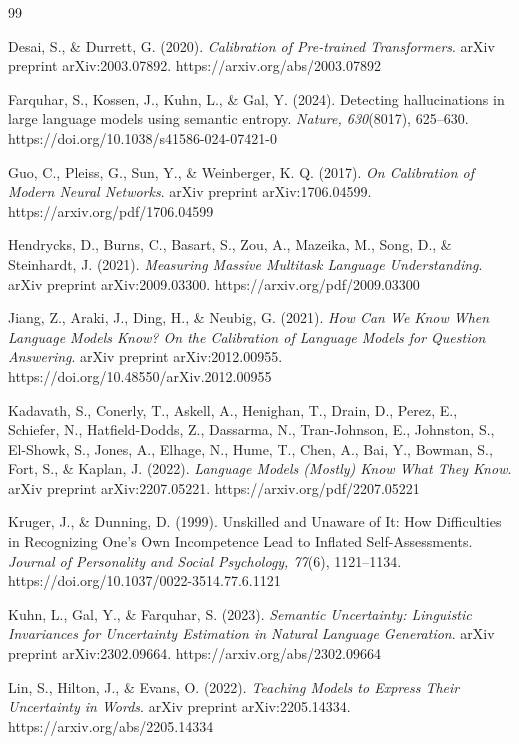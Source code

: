 \documentclass[twoside,twocolumn,10pt]{article}
\begin{document}
\begin{thebibliography}{99}

Desai, S., \& Durrett, G. (2020).
\textit{Calibration of Pre-trained Transformers}.
arXiv preprint arXiv:2003.07892.
https://arxiv.org/abs/2003.07892

Farquhar, S., Kossen, J., Kuhn, L., \& Gal, Y. (2024).
Detecting hallucinations in large language models using semantic entropy.
\textit{Nature, 630}(8017), 625--630.
https://doi.org/10.1038/s41586-024-07421-0

Guo, C., Pleiss, G., Sun, Y., \& Weinberger, K. Q. (2017).
\textit{On Calibration of Modern Neural Networks}.
arXiv preprint arXiv:1706.04599.
https://arxiv.org/pdf/1706.04599

Hendrycks, D., Burns, C., Basart, S., Zou, A., Mazeika, M., Song, D., \& Steinhardt, J. (2021).
\textit{Measuring Massive Multitask Language Understanding}.
arXiv preprint arXiv:2009.03300.
https://arxiv.org/pdf/2009.03300

Jiang, Z., Araki, J., Ding, H., \& Neubig, G. (2021).
\textit{How Can We Know When Language Models Know? On the Calibration of Language Models for Question Answering}.
arXiv preprint arXiv:2012.00955.
https://doi.org/10.48550/arXiv.2012.00955

Kadavath, S., Conerly, T., Askell, A., Henighan, T., Drain, D., Perez, E., Schiefer, N., Hatfield-Dodds, Z., Dassarma, N., Tran-Johnson, E., Johnston, S., El-Showk, S., Jones, A., Elhage, N., Hume, T., Chen, A., Bai, Y., Bowman, S., Fort, S., \& Kaplan, J. (2022).
\textit{Language Models (Mostly) Know What They Know}.
arXiv preprint arXiv:2207.05221.
https://arxiv.org/pdf/2207.05221

Kruger, J., \& Dunning, D. (1999).
Unskilled and Unaware of It: How Difficulties in Recognizing One's Own Incompetence Lead to Inflated Self-Assessments.
\textit{Journal of Personality and Social Psychology, 77}(6), 1121--1134.
https://doi.org/10.1037/0022-3514.77.6.1121

Kuhn, L., Gal, Y., \& Farquhar, S. (2023).
\textit{Semantic Uncertainty: Linguistic Invariances for Uncertainty Estimation in Natural Language Generation}.
arXiv preprint arXiv:2302.09664.
https://arxiv.org/abs/2302.09664

Lin, S., Hilton, J., \& Evans, O. (2022).
\textit{Teaching Models to Express Their Uncertainty in Words}.
arXiv preprint arXiv:2205.14334.
https://arxiv.org/abs/2205.14334


\end{thebibliography}
\end{document}
